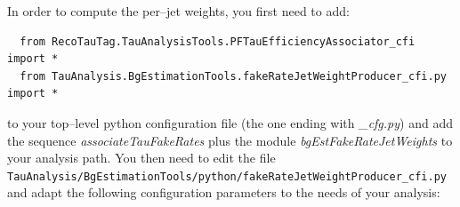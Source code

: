 In order to compute the per--jet weights, you first need to add:
\begin{small}
\begin{verbatim}
  from RecoTauTag.TauAnalysisTools.PFTauEfficiencyAssociator_cfi import *
  from TauAnalysis.BgEstimationTools.fakeRateJetWeightProducer_cfi.py import *
\end{verbatim}
\end{small}
to your top--level python configuration file (the one ending with {\it \_cfg.py}) 
and add the sequence {\it associateTauFakeRates} plus the module {\it bgEstFakeRateJetWeights} to your analysis path.
You then need to edit the file \newline
\verb|TauAnalysis/BgEstimationTools/python/fakeRateJetWeightProducer_cfi.py| and adapt 
the following configuration parameters to the needs of your analysis:
